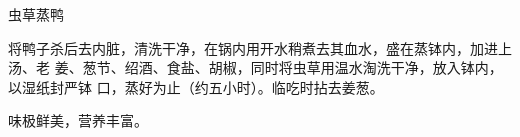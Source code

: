%
%
%
%
%
%
%
\begin{recipe}{虫草蒸鸭}

\ingredients


\preparation

将鸭子杀后去内脏，清洗干净，在锅内用开水稍煮去其血水，盛在蒸钵内，加进上汤、老
姜、葱节、绍酒、食盐、胡椒，同时将虫草用温水淘洗干净，放入钵内，以湿纸封严钵
口，蒸好为止（约五小时）。临吃时拈去姜葱。

\features

味极鲜美，营养丰富。

\end{recipe}

